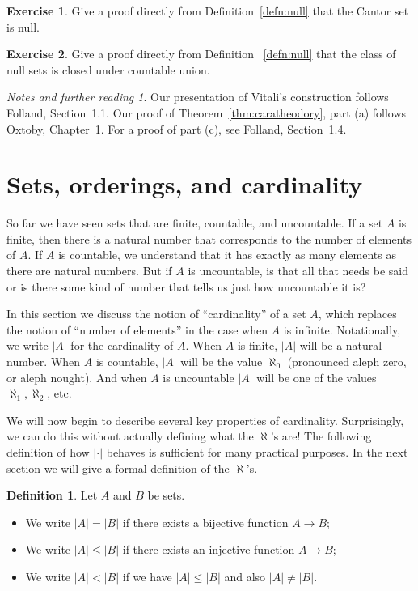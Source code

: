 \documentclass[11pt,oneside,a4paper]{amsbook}
\theoremstyle{definition}
\newtheorem{exercise}{Exercise}[section]
\theoremstyle{plain}
\theoremstyle{definition}
\newtheorem{definition}[theorem]{Definition}
\theoremstyle{remark}
\newtheorem*{notes}{Notes and further reading}
\numberwithin{equation}{section}
\numberwithin{figure}{section}
\begin{document}
\begin{exercise}
  Give a proof directly from Definition~\ref{defn:null} that the Cantor set is null.
\end{exercise}

\begin{exercise}
  Give a proof directly from Definition ~\ref{defn:null} that the class of null sets is closed under countable union.
\end{exercise}

\begin{notes}
  Our presentation of Vitali's construction follows Folland, Section~1.1. Our proof of Theorem~\ref{thm:caratheodory}, part (a) follows Oxtoby, Chapter~1. For a proof of part (c), see Folland, Section~1.4.
\end{notes}


\newpage
\section{Sets, orderings, and cardinality}

So far we have seen sets that are finite, countable, and uncountable. If a set $A$ is finite, then there is a natural number that corresponds to the number of elements of $A$. If $A$ is countable, we understand that it has exactly as many elements as there are natural numbers. But if $A$ is uncountable, is that all that needs be said or is there some kind of number that tells us just how uncountable it is?

In this section we discuss the notion of ``cardinality'' of a set $A$, which replaces the notion of ``number of elements'' in the case when $A$ is infinite. Notationally, we write $|A|$ for the cardinality of $A$. When $A$ is finite, $|A|$ will be a natural number. When $A$ is countable, $|A|$ will be the value $\aleph_0$ (pronounced aleph zero, or aleph nought). And when $A$ is uncountable $|A|$ will be one of the values $\aleph_1,\aleph_2$, etc.

We will now begin to describe several key properties of cardinality. Surprisingly, we can do this without actually defining what the $\aleph$'s are! The following definition of how $|\cdot|$ behaves is sufficient for many practical purposes. In the next section we will give a formal definition of the $\aleph$'s.

\begin{definition}
  \label{defn:cardinal-rel}
  Let $A$ and $B$ be sets.
  \begin{itemize}
    \item We write $|A|=|B|$ if there exists a bijective function $A\to B$;
    \item We write $|A|\leq|B|$ if there exists an injective function $A\to B$;
    \item We write $|A|<|B|$ if we have $|A|\leq|B|$ and also $|A|\neq|B|$.
  \end{itemize}
\end{definition}
\end{document}

